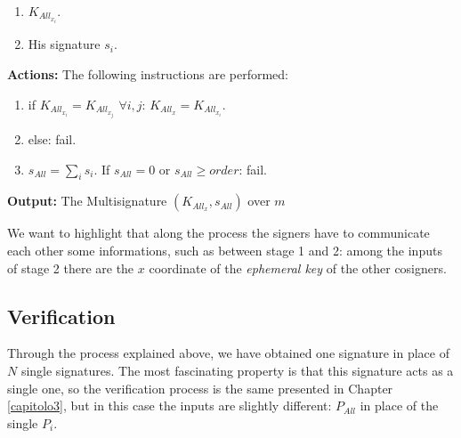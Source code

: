 \hspace{1.1cm}
\begin{minipage}[l]{2\linewidth}
	\begin{enumerate}
		\item $K_{All_{x_{i}}}$.
		\item His signature $s_{i}$.\\
	\end{enumerate}
\end{minipage}


\textbf{Actions:} The following instructions are performed:

\hspace{1.2cm}
\begin{minipage}[l]{2\linewidth}
	\begin{enumerate}
		\item if $K_{All_{x_{i}}}=K_{All_{x_{j}}}$ $\forall i,j$: $K_{All_{x}}= K_{All_{x_{i}}}$.
		\item else: fail.
		\item $s_{All}=\sum_{i}{s_{i}}$.
		If $s_{All}=0$ or $s_{All}\geq order$: fail.
	\end{enumerate}
\end{minipage}

\textbf{Output:} The Multisignature $(K_{All_{x}}, s_{All})$ over $m$

We want to highlight that along the process the signers have to communicate each other some informations, such as between stage 1 and 2: among the inputs of stage 2 there are the $x$ coordinate of the \textit{ephemeral key} of the other cosigners.
\subsection{Verification}
Through the process explained above, we have obtained one signature in place of $N$ single signatures. The most fascinating property is that this signature acts as a single one, so the verification process is the same presented in Chapter \eqref{capitolo3}, but in this case the inputs are slightly different: $P_{All}$ in place of the single $P_{i}$.


